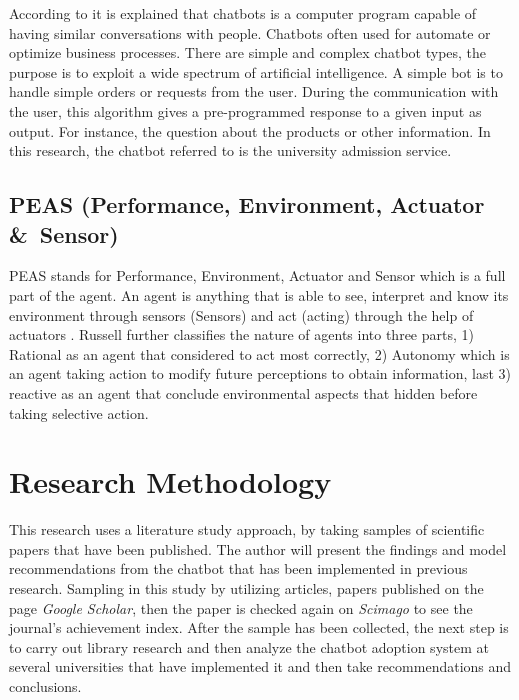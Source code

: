 \documentclass[conference]{IEEEtran}
\begin{document}
According to \cite{b17} it is explained that chatbots is a computer program capable of having similar conversations with people. Chatbots often used for automate or optimize business processes. There are simple and complex chatbot types, the purpose is to exploit a wide spectrum of artificial intelligence. A simple bot is to handle simple orders or requests from the user. During the communication with the user, this algorithm gives a pre-programmed response to a given input as output. For instance, the question about the products or other information. In this research, the chatbot referred to is the university admission service.

\subsection{PEAS (Performance, Environment, Actuator \&\ Sensor)}
PEAS stands for Performance, Environment, Actuator and Sensor which is a full part of the agent. An agent is anything that is able to see, interpret and know its environment through sensors (Sensors) and act (acting) through the help of actuators \cite{b18}. Russell further classifies the nature of agents into three parts, 1) Rational as an agent that considered to act most correctly, 2) Autonomy which is an agent taking action to modify future perceptions to obtain information, last 3) reactive as an agent that conclude environmental aspects that hidden before taking selective action.

\section{Research Methodology}
This research uses a literature study approach, by taking samples of scientific papers that have been published. The author will present the findings and model recommendations from the chatbot that has been implemented in previous research. Sampling in this study by utilizing articles, papers published on the page \emph{Google Scholar}, then the paper is checked again on \emph{Scimago} to see the journal's achievement index. After the sample has been collected, the next step is to carry out library research and then analyze the chatbot adoption system at several universities that have implemented it and then take recommendations and conclusions.
\end{document}

